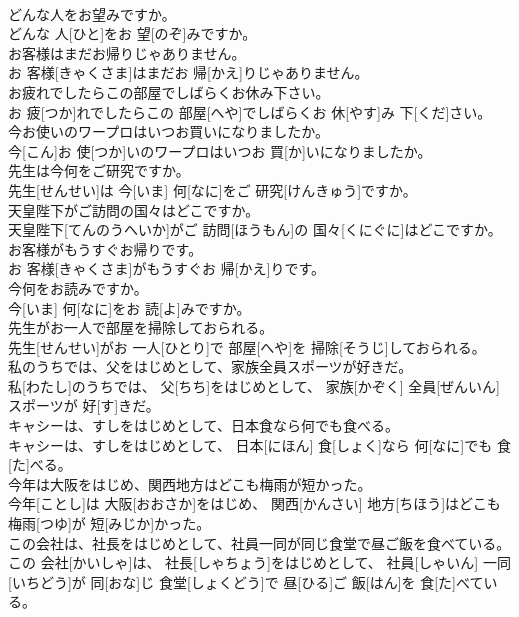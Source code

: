 \documentclass[8pt]{extreport}
\begin{document}
\begin{CJK}{UTF8}{min}
\\	どんな人をお望みですか。	
\\	どんな 人[ひと]をお 望[のぞ]みですか。
\\	お客様はまだお帰りじゃありません。	
\\	お 客様[きゃくさま]はまだお 帰[かえ]りじゃありません。
\\	お疲れでしたらこの部屋でしばらくお休み下さい。	
\\	お 疲[つか]れでしたらこの 部屋[へや]でしばらくお 休[やす]み 下[くだ]さい。
\\	今お使いのワープロはいつお買いになりましたか。	
\\	今[こん]お 使[つか]いのワープロはいつお 買[か]いになりましたか。
\\	先生は今何をご研究ですか。	
\\	先生[せんせい]は 今[いま] 何[なに]をご 研究[けんきゅう]ですか。
\\	天皇陛下がご訪問の国々はどこですか。	
\\	天皇陛下[てんのうへいか]がご 訪問[ほうもん]の 国々[くにぐに]はどこですか。
\\	お客様がもうすぐお帰りです。	
\\	お 客様[きゃくさま]がもうすぐお 帰[かえ]りです。
\\	今何をお読みですか。	
\\	今[いま] 何[なに]をお 読[よ]みですか。
\\	先生がお一人で部屋を掃除しておられる。	
\\	先生[せんせい]がお 一人[ひとり]で 部屋[へや]を 掃除[そうじ]しておられる。
\\	私のうちでは、父をはじめとして、家族全員スポーツが好きだ。	
\\	私[わたし]のうちでは、 父[ちち]をはじめとして、 家族[かぞく] 全員[ぜんいん]スポーツが 好[す]きだ。
\\	キャシーは、すしをはじめとして、日本食なら何でも食べる。	
\\	キャシーは、すしをはじめとして、 日本[にほん] 食[しょく]なら 何[なに]でも 食[た]べる。
\\	今年は大阪をはじめ、関西地方はどこも梅雨が短かった。	
\\	今年[ことし]は 大阪[おおさか]をはじめ、 関西[かんさい] 地方[ちほう]はどこも 梅雨[つゆ]が 短[みじか]かった。
\\	この会社は、社長をはじめとして、社員一同が同じ食堂で昼ご飯を食べている。	
\\	この 会社[かいしゃ]は、 社長[しゃちょう]をはじめとして、 社員[しゃいん] 一同[いちどう]が 同[おな]じ 食堂[しょくどう]で 昼[ひる]ご 飯[はん]を 食[た]べている。

\end{CJK}
\end{document}
